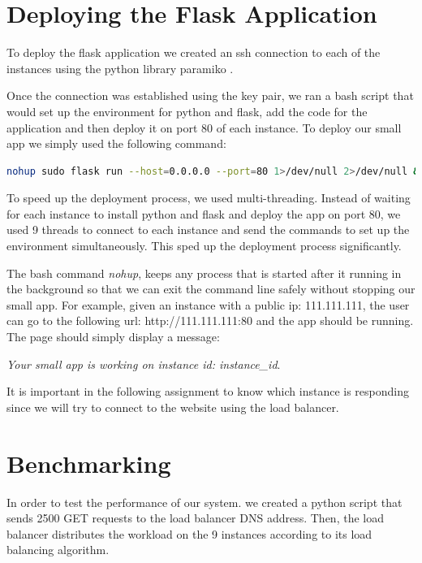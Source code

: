 \documentclass[12pt]{article}
\begin{document}
\section{Deploying the Flask Application}

To deploy the flask application we created an ssh connection to each of the instances using the python library paramiko \cite{paramiko}.\vspace{1em}

Once the connection was established using the key pair, we ran a bash script that would set up the environment for python and flask, add the code for the application and then deploy it on port 80 of each instance.\vspace{1em}
To deploy our small app we simply used the following command:
\begin{lstlisting}[language=Bash]
nohup sudo flask run --host=0.0.0.0 --port=80 1>/dev/null 2>/dev/null &
\end{lstlisting}\vspace{1em}

To speed up the deployment process, we used multi-threading. Instead of waiting for each instance to install python and flask and deploy the app on port 80, we used 9 threads to connect to each instance and send the commands to set up the environment simultaneously. This sped up the deployment process significantly.\vspace{1em}

The bash command \emph{nohup}, keeps any process that is started after it running in the background so that we can exit the command line safely without stopping our small app. For example, given an instance with a public ip: 111.111.111, the user can go to the following url: http://111.111.111:80 and the app should be running. The page should simply display a message:\vspace{1em}

\emph{Your small app is working on instance id: instance\_id}.\vspace{1em}

It is important in the following assignment to know which instance is responding since we will try to connect to the website using the load balancer. 

\section{Benchmarking}

In order to test the performance of our system. we created a python script that sends 2500 GET requests to the load balancer DNS address. Then, the load balancer distributes the workload on the 9 instances according to its load balancing algorithm.\vspace{1em}
\end{document}
